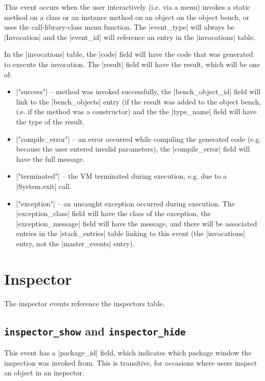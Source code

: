 \documentclass{book}
\begin{document}
This event occurs when the user interactively (i.e. via a menu) invokes a
static method on a class or an instance method on an object on the object
bench, or uses the call-library-class menu function.  The |event_type| will
always be |Invocation| and the |event_id| will reference an entry in the
|invocations| table.  

In the |invocations| table, the |code| field will have the code that was generated
to execute the invocation.  The |result| field will have the result, which will be one of:

\begin{itemize}
\item |"success"| -- method was invoked successfully, the |bench_object_id|
  field will link to the |bench_objects| entry (if the result was added to the
  object bench, i.e. if the method was a constructor) and the the |type_name|
  field will have the type of the result.
\item |"compile_error"| -- an error occurred while compiling the generated code
  (e.g. because the user entered invalid parameters), the |compile_error|
  field will have the full message.
\item |"terminated"| -- the VM terminated during execution, e.g. due to a
  |System.exit| call.
\item |"exception"| -- an uncaught exception occurred during execution.  The
  |exception_class| field will have the class of the exception, the
  |exception_message| field will have the message, and there will be
  associated entries in the |stack_entries| table linking to this event (the
  |invocations| entry, not the |master_events| entry).
\end{itemize}

\section{Inspector}

The inspector events reference the inspectors table.


\subsection{\lstinline|inspector_show| and \lstinline|inspector_hide|}

This event has a |package_id| field, which indicates which package window the
inspection was invoked from.  This is transitive, for occasions where users
inspect an object in an inspector.
\end{document}
